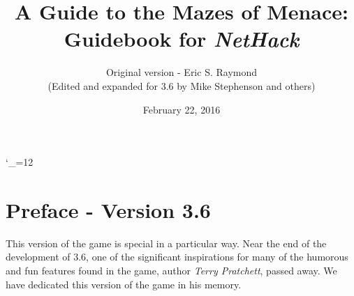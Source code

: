 \textheight 220mm
\textwidth 160mm
\oddsidemargin 0mm
\evensidemargin 0mm
\topmargin 0mm

\newcommand{\nd}{\noindent}

\newcommand{\tb}[1]{\tt #1 \hfill}
\newcommand{\bb}[1]{\bf #1 \hfill}
\newcommand{\ib}[1]{\it #1 \hfill}

\newcommand{\blist}[1]
{\begin{list}{$\bullet$}
    {\leftmargin 30mm \topsep 2mm \partopsep 0mm \parsep 0mm \itemsep 1mm
     \labelwidth 28mm \labelsep 2mm
     #1}}

\newcommand{\elist}{\end{list}}

\catcode`\_=12


%
%

\title{\LARGE A Guide to the Mazes of Menace:\\
\Large Guidebook for {\it NetHack\/}}

\author{Original version - Eric S. Raymond\\
(Edited and expanded for 3.6 by Mike Stephenson and others)}
\date{February 22, 2016}

\maketitle

\section{Preface - Version 3.6}
This version of the game is special in a particular way.  Near the end of 
the development of 3.6, one of the significant inspirations for many of the 
humorous and fun features found in the game, author {\it Terry Pratchett}, 
passed away.  We have dedicated this version of the game in his memory.

